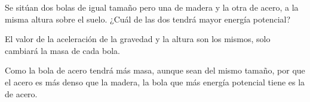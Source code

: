 Se sitúan dos bolas de igual tamaño pero una de madera y la otra de acero, a la misma altura sobre el suelo. ¿Cuál de las dos tendrá mayor energía potencial?


\begin{solutionbox}{3cm}
    El valor de la aceleración de la gravedad y la altura son los mismos, solo cambiará la masa de cada bola.

    Como la bola de acero tendrá más masa, aunque sean del mismo tamaño, por que el acero es más denso que la madera, la bola que más energía potencial tiene es la de acero.
\end{solutionbox}

